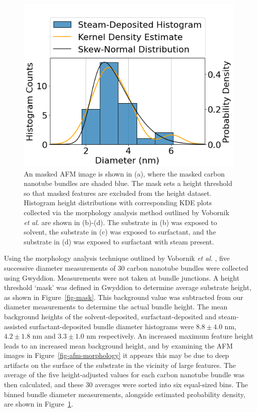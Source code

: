 \documentclass[
  a4paper,
]{scrbook}
\begin{document}
\begin{figure}
\begin{minipage}[t]{0.47\linewidth}
{{\includegraphics{figures/ch6/NT14D2_W4_pristine_cnt_histogram.png}

}

}

\subcaption{\label{fig-steamed-surfactant-cnt-histogram}}
\end{minipage}%

\caption{\label{fig-cnt-histogram}An masked AFM image is shown in (a),
where the masked carbon nanotube bundles are shaded blue. The mask sets
a height threshold so that masked features are excluded from the height
dataset. Histogram height distributions with corresponding KDE plots
collected via the morphology analysis method outlined by Vobornik
\emph{et al.} \autocite{Vobornik2023} are shown in (b)-(d). The
substrate in (b) was exposed to solvent, the substrate in (c) was
exposed to surfactant, and the substrate in (d) was exposed to
surfactant with steam present.}

\end{figure}

Using the morphology analysis technique outlined by Vobornik \emph{et
al.} \autocite{Vobornik2023}, five successive diameter measurements of
30 carbon nanotube bundles were collected using Gwyddion. Measurements
were not taken at bundle junctions. A height threshold `mask' was
defined in Gwyddion to determine average substrate height, as shown in
Figure~\ref{fig-mask}. This background value was subtracted from our
diameter measurements to determine the actual bundle height. The mean
background heights of the solvent-deposited, surfactant-deposited and
steam-assisted surfactant-deposited bundle diameter histograms were
\(8.8 \pm 4.0\) nm, \(4.2 \pm 1.8\) nm and \(3.3 \pm 1.0\) nm
respectively. An increased maximum feature height leads to an increased
mean background height, and by examining the AFM images in
Figure~\ref{fig-afm-morphology} it appears this may be due to deep
artifacts on the surface of the substrate in the vicinity of large
features. The average of the five height-adjusted values for each carbon
nanotube bundle was then calculated, and these 30 averages were sorted
into six equal-sized bins. The binned bundle diameter measurements,
alongside estimated probability density, are shown in
Figure~\ref{fig-cnt-histogram}.
\end{document}
